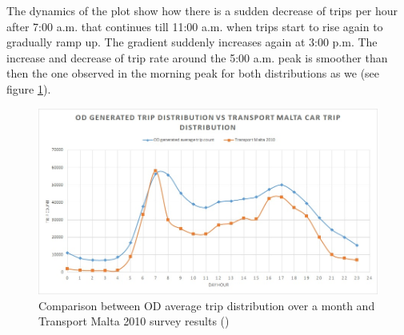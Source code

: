\documentclass[12pt, a4paper]{report}
\theoremstyle{definition}
\theoremstyle{definition}%
\theoremstyle{definition}%
\theoremstyle{definition}%
\theoremstyle{definition}%
\theoremstyle{definition}%
\begin{document}
\begin{table}[!] 	
	\centering
	\caption[NHTS and OD trip distributions correlation statistics]{NHTS and OD trip distributions proved to be highly correlated. $ ^* p < 0.001$  } 
	\label{table:trip_dsitribution_statistical_analysis}	
\end{table}

The dynamics of the plot show how there is a sudden decrease of trips per hour after 7:00 a.m. that continues till 11:00 a.m. when trips start to rise again to gradually ramp up. The gradient suddenly increases again at 3:00 p.m. The increase and decrease of trip rate around the 5:00 a.m. peak is smoother than then the one observed in the morning peak for both distributions as we (see figure \ref{fig:trip_count_correlation}). 


\begin{figure}[!]	
	\includegraphics[scale=0.6]{Trip_count_correlation.jpg}
	\centering
	\caption[Comparison between NHTS and OD average trip distribution ]{Comparison between OD average trip distribution over a month and Transport Malta 2010 survey results (\cite{malta2011national})}
	\label{fig:trip_count_correlation}
\end{figure}
\end{document}
